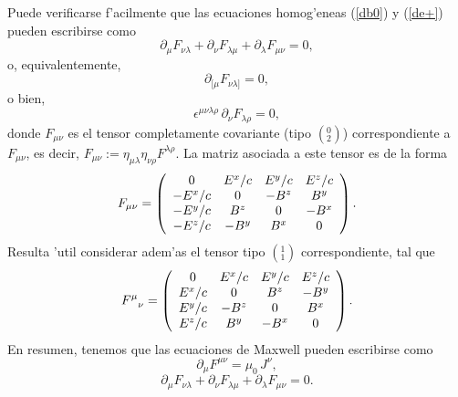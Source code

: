 Puede verificarse f'acilmente que las ecuaciones homog'eneas (\ref{db0}) y (\ref{de+}) pueden escribirse como
\begin{equation}
\partial_\mu F_{\nu\lambda}+\partial_\nu F_{\lambda\mu}+\partial_\lambda
F_{\mu\nu}=0,
\end{equation}
o, equivalentemente,
\begin{equation}
\partial_{[\mu}F_{\nu\lambda]}=0,
\end{equation}
o bien,
\begin{equation}
\epsilon^{\mu\nu\lambda\rho}\,\partial_{\nu}F_{\lambda\rho}=0,
\end{equation}
donde $F_{\mu\nu}$ es el tensor completamente covariante (tipo $(^0_2)$)
correspondiente a $F_{\mu\nu}$, es decir,
$F_{\mu\nu}:=\eta_{\mu\lambda}\eta_{\nu\rho}F^{\lambda\rho}$. La matriz asociada
a este tensor es de la forma
\begin{equation}
F_{\mu\nu}=\left(
\begin{array}
[c]{cccc}%
0 & E^x/c & E^y/c & E^z/c\\
-E^x/c & 0 & -B^z & B^y\\
-E^y/c & B^z & 0 & -B^x\\
-E^z/c & -B^y & B^x & 0
\end{array}
\right). \label{Fdndn}
\end{equation}
Resulta 'util considerar adem'as el tensor tipo $(^1_1)$ correspondiente, tal que
\begin{equation}
F^\mu_{\ \ \nu}=\left(
\begin{array}
[c]{cccc}%
0 & E^x/c & E^y/c & E^z/c\\
E^x/c & 0 & B^z & -B^y\\
E^y/c & -B^z & 0 & B^x\\
E^z/c & B^y & -B^x & 0
\end{array}
\right). \label{Fupdn}
\end{equation}
En resumen, tenemos que las ecuaciones de Maxwell pueden escribirse como
\begin{equation}
\boxed{\partial_\mu  F^{\mu \nu} = \mu_0\, J^\nu,} \label{emihF}
\end{equation}
\begin{equation}
\boxed{\partial_\mu F_{\nu\lambda}+\partial_\nu F_{\lambda\mu}+\partial_\lambda
F_{\mu\nu}=0.} \label{homcov}
\end{equation}

